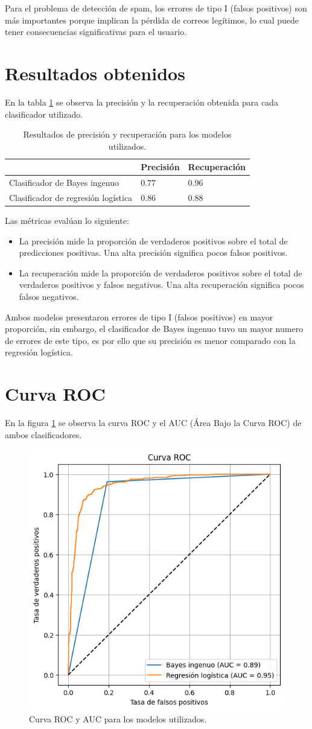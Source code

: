\documentclass[onecolumn]{IEEEtran}
\begin{document}
Para el problema de detección de spam, los errores de tipo I (falsos positivos) son más importantes porque implican la pérdida de correos legítimos, lo cual puede tener consecuencias significativas para el usuario.

\section*{Resultados obtenidos}

En la tabla \ref{tab:performance-metrics} se observa la precisión y la recuperación obtenida para cada clasificador utilizado.

\begin{table}[ht]
\centering
\begin{tabular}{|l|l|l|}
\hline
 & Precisión & Recuperación \\ \hline
Clasificador de Bayes ingenuo & 0.77 & 0.96 \\ \hline
Clasificador de regresión logística & 0.86 & 0.88 \\ \hline
\end{tabular}
\caption{Resultados de precisión y recuperación para los modelos utilizados.}
\label{tab:performance-metrics}
\end{table}

Las métricas evalúan lo siguiente:
\begin{itemize}
    \item La precisión mide la proporción de verdaderos positivos sobre el total de predicciones positivas. Una alta precisión significa pocos falsos positivos.
    \item La recuperación mide la proporción de verdaderos positivos sobre el total de verdaderos positivos y falsos negativos. Una alta recuperación significa pocos falsos negativos.
\end{itemize}

Ambos modelos presentaron errores de tipo I (falsos positivos) en mayor proporción, sin embargo, el clasificador de Bayes ingenuo tuvo un mayor numero de errores de este tipo, es por ello que su precisión es menor comparado con la regresión logística.

\section*{Curva ROC}

En la figura \ref{fig:roc} se  observa la curva ROC y el AUC (Área Bajo la Curva ROC) de ambos clasificadores.

\begin{figure}[ht]
    \centering
    \includegraphics[width=0.5\linewidth]{roc.png}
    \caption{Curva ROC y AUC para los modelos utilizados.}
    \label{fig:roc}
\end{figure}
\end{document}
